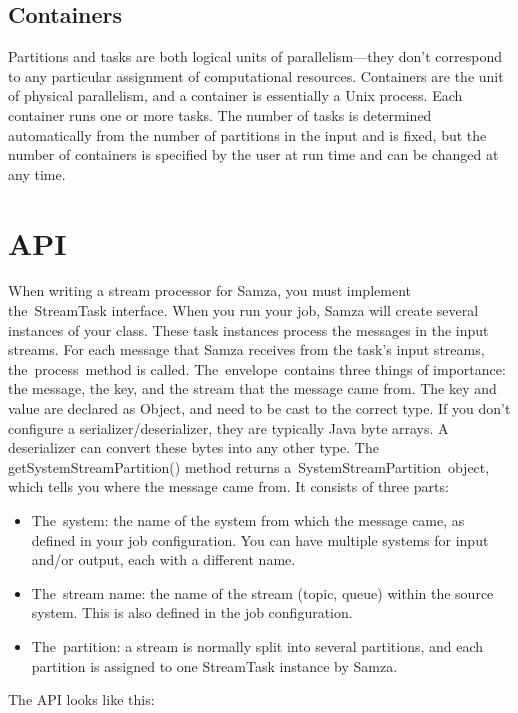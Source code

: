 \documentclass[9pt,twocolumn,twoside]{../../styles/osajnl}
\begin{document}
\subsection{Containers}
Partitions and tasks are both logical units of parallelism—they don’t correspond
to any particular assignment of computational resources. Containers are the unit
of physical parallelism, and a container is essentially a Unix process. Each
container runs one or more tasks. The number of tasks is determined
automatically from the number of partitions in the input and is fixed, but the
number of containers is specified by the user at run time and can be changed at
any time.\cite{www-samza}

\section{API}
When writing a stream processor for Samza, you must implement the StreamTask
interface. When you run your job, Samza will create several instances of your
class. These task instances process the messages in the input streams. For each
message that Samza receives from the task’s input streams, the process method is
called. The envelope contains three things of importance: the message, the key,
and the stream that the message came from. The key and value are declared as
Object, and need to be cast to the correct type. If you don’t configure a
serializer/deserializer, they are typically Java byte arrays. A deserializer
can convert these bytes into any other type.\cite{www-samza}
The getSystemStreamPartition() method returns a SystemStreamPartition object,
which tells you where the message came from. It consists of three parts:

\begin{itemize}
\renewcommand{\labelitemi}{\scriptsize$\square$} 
\item The system: the name of the system from which the message came, as defined
in your job configuration. You can have multiple systems for input and/or
output, each with a different name.
\item The stream name: the name of the stream (topic, queue) within the source
system. This is also defined in the job configuration.
\item The partition: a stream is normally split into several partitions, and
each partition is assigned to one StreamTask instance by Samza.
\end{itemize}

The API looks like this:\newline
\end{document}
